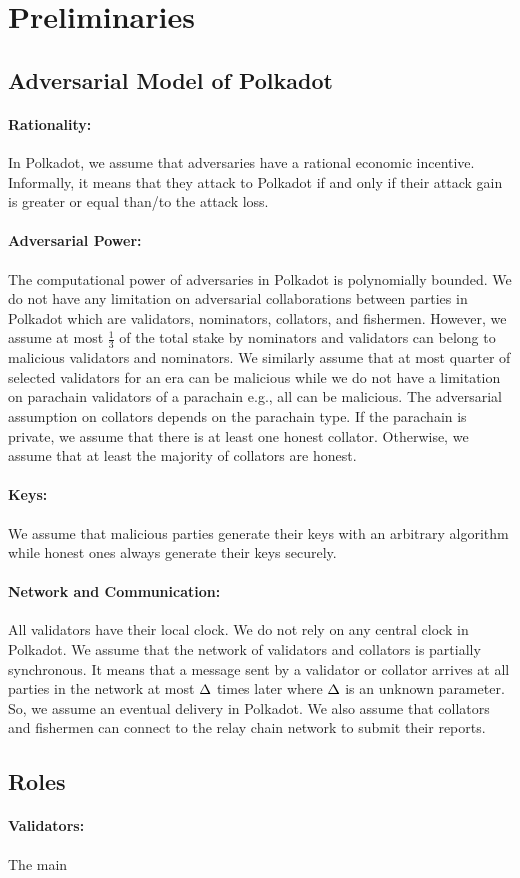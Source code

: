 \section{Preliminaries}

\subsection{Adversarial Model of Polkadot}

\paragraph{Rationality:} In Polkadot, we assume that adversaries have a rational economic incentive. Informally, it means that they attack to Polkadot if and only if their attack gain is greater or equal than/to the attack loss. 

\paragraph{Adversarial Power:} The computational power of adversaries in Polkadot is polynomially bounded.  We do not have any limitation on adversarial collaborations between parties in Polkadot which are validators, nominators, collators, and fishermen. However, we assume at most $\frac{1}{3}$ of the total stake by nominators and validators can belong to malicious validators and nominators. 
We similarly assume that at most quarter of selected validators for an era can be malicious while we do not have a limitation on parachain validators of a parachain e.g., all can be malicious.  
The adversarial assumption on collators depends on the parachain type. If the parachain is private, we assume that there is at least one honest collator. Otherwise, we assume that at least the majority of collators are honest.

\paragraph{Keys:} We assume that malicious parties generate their keys with an arbitrary algorithm while honest ones always generate their keys securely.

\paragraph{Network and Communication:} All validators have their local clock. We do not rely on any central clock in Polkadot. We assume that the network of validators and collators is partially synchronous. It means that a message sent by a validator or collator arrives at all parties in the network at most $\Delta$ times later where $\Delta$ is an unknown parameter. So, we assume an eventual delivery in Polkadot.
We also assume that collators and fishermen can connect to the relay chain network to submit their reports.

\subsection{Roles}

\paragraph{Validators:} The main
